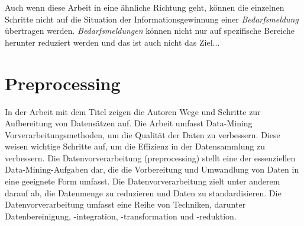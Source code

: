 Auch wenn diese Arbeit in eine ähnliche Richtung geht, können die einzelnen Schritte nicht auf die Situation der Informationsgewinnung einer \emph{Bedarfsmeldung} übertragen werden. \emph{Bedarfsmeldungen} können nicht nur auf spezifische Bereiche herunter reduziert werden und das ist auch nicht das Ziel...\\

\section{Preprocessing}
In der Arbeit mit dem Titel \cite{alasadi2017review} zeigen die Autoren \citeauthor{alasadi2017review} Wege und Schritte zur Aufbereitung von Datensätzen auf. Die Arbeit umfasst Data-Mining Vorverarbeitungsmethoden, um die Qualität der Daten zu verbessern. Diese weisen wichtige Schritte auf, um die Effizienz in der Datensammlung zu verbessern. Die Datenvorverarbeitung (preprocessing) stellt eine der essenziellen Data-Mining-Aufgaben dar, die die Vorbereitung und Umwandlung von Daten in eine geeignete Form umfasst. Die Datenvorverarbeitung zielt unter anderem darauf ab, die Datenmenge zu reduzieren und Daten zu standardisieren. Die Datenvorverarbeitung umfasst eine Reihe von Techniken, darunter Datenbereinigung, -integration, -transformation und -reduktion. \\

